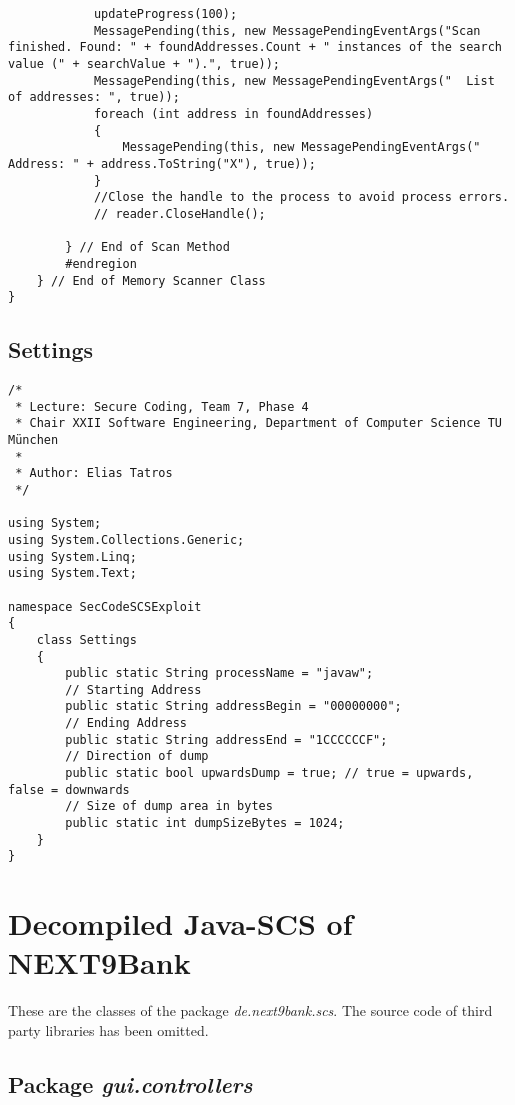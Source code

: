\begin{lstlisting}
            updateProgress(100);
            MessagePending(this, new MessagePendingEventArgs("Scan finished. Found: " + foundAddresses.Count + " instances of the search value (" + searchValue + ").", true));
            MessagePending(this, new MessagePendingEventArgs("  List of addresses: ", true));
            foreach (int address in foundAddresses)
            {
                MessagePending(this, new MessagePendingEventArgs("    Address: " + address.ToString("X"), true));
            }
            //Close the handle to the process to avoid process errors.
            // reader.CloseHandle();

        } // End of Scan Method
        #endregion
    } // End of Memory Scanner Class
}

\end{lstlisting}

\section{Settings}

\begin{lstlisting}
/* 
 * Lecture: Secure Coding, Team 7, Phase 4
 * Chair XXII Software Engineering, Department of Computer Science TU München
 *
 * Author: Elias Tatros
 */

using System;
using System.Collections.Generic;
using System.Linq;
using System.Text;

namespace SecCodeSCSExploit
{
    class Settings
    {
        public static String processName = "javaw";
        // Starting Address
        public static String addressBegin = "00000000";
        // Ending Address
        public static String addressEnd = "1CCCCCCF";
        // Direction of dump
        public static bool upwardsDump = true; // true = upwards, false = downwards
        // Size of dump area in bytes
        public static int dumpSizeBytes = 1024;
    }
}
\end{lstlisting}

\chapter{Decompiled Java-SCS of NEXT9Bank}
\label{appendix:java_scs}

These are the classes of the package \textit{de.next9bank.scs}. The source code of third party libraries has been omitted.


\section{Package \textit{gui.controllers}}

